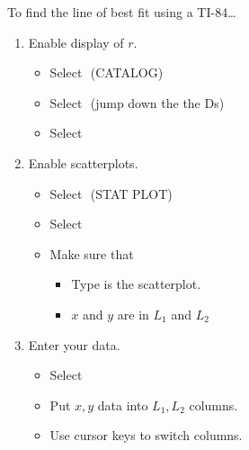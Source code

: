 %
\begin{minipage}[t]{0.5\textwidth}
    \begin{myConcept}{To find the line of best fit using a {\scshape TI-84}\dots}
        \begin{enumerate}
            \item Enable display of $r$.
                \begin{itemize}
                    \item Select 
                        \,\,{\footnotesize\ttfamily (CATALOG)}
                    \item Select 
                        \,\,{\footnotesize (jump down the the Ds)}
                    \item Select 
                \end{itemize}
            \item Enable scatterplots.
                \begin{itemize}
                    \item Select 
                        \,\,{\footnotesize\ttfamily (STAT PLOT)}
                    \item Select 
                    \item Make sure that 
                        \begin{itemize} 
                            \item {\ttfamily Type} is the scatterplot.
                            \item $x$ and $y$ are in $L_1$ and $L_2$ 
                        \end{itemize}
                \end{itemize}
            \item Enter your data.
                \begin{itemize}
                    \item Select 
                    \item Put $x, y$ data into $L_1, L_2$ columns.
                    \item Use cursor keys to switch columns.

\end{itemize}
\end{enumerate}
\end{myConcept}
\end{minipage}
